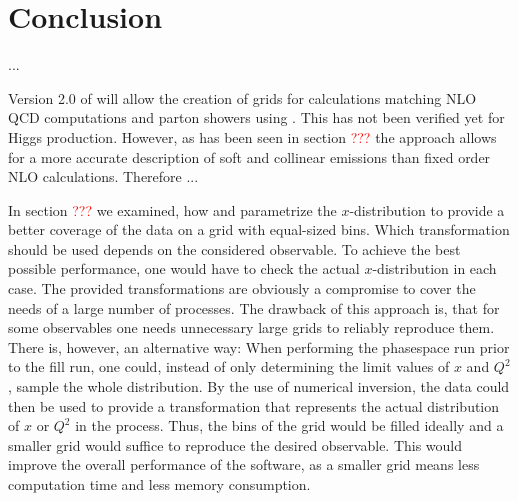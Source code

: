 
\chapter{Conclusion}
... 

Version 2.0 of \mcgrid{} will allow the creation of grids for calculations matching NLO QCD computations and parton showers using \mcatnlo{}.
This has not been verified yet for Higgs production.
However, as has been seen in section \textcolor{red}{???} the \mcatnlo{} approach allows for a more accurate description of soft and collinear emissions than fixed order NLO calculations.
Therefore ...


In section \textcolor{red}{???} we examined, how \appl{} and \fnlo{} parametrize the $x$-distribution to provide a better coverage of the data on a grid with equal-sized bins.
Which transformation should be used depends on the considered observable.
To achieve the best possible performance, one would have to check the actual $x$-distribution in each case.
The provided transformations are obviously a compromise to cover the needs of a large number of processes.
The drawback of this approach is, that for some observables one needs unnecessary large grids to reliably reproduce them.
There is, however, an alternative way: When performing the phasespace run prior to the fill run, one could, instead of only determining the limit values of $x$ and $Q^2$, sample the whole distribution.
By the use of numerical inversion, the data could then be used to provide a transformation that represents the actual distribution of $x$ or $Q^2$ in the process.
Thus, the bins of the grid would be filled ideally and a smaller grid would suffice to reproduce the desired observable.
This would improve the overall performance of the software, as a smaller grid means less computation time and less memory consumption.
